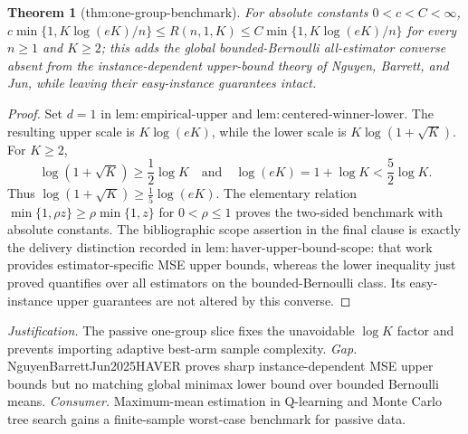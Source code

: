 \documentclass{article}
\newtheorem{theorem}{Theorem}
\begin{document}
\begin{theorem}[thm:one-group-benchmark]\label{thm:one-group-benchmark}
For absolute constants \(0<c<C<\infty\), \(c\min\{1,K\log(eK)/n\}\le R(n,1,K)\le C\min\{1,K\log(eK)/n\}\) for every \(n\ge1\) and \(K\ge2\); this adds the global bounded-Bernoulli all-estimator converse absent from the instance-dependent upper-bound theory of Nguyen, Barrett, and Jun, while leaving their easy-instance guarantees intact.
\end{theorem}
\begin{proof}
Set \(d=1\) in \(\mathrm{lem{:}empirical\text{-}upper}\) and \(\mathrm{lem{:}centered\text{-}winner\text{-}lower}\).  The resulting upper scale is \(K\log(eK)\), while the lower scale is \(K\log(1+\sqrt K)\).  For \(K\geq2\),
\[
 \log(1+\sqrt K)\geq\frac12\log K
 \quad\text{and}\quad
 \log(eK)=1+\log K<\frac52\log K.
\]
Thus \(\log(1+\sqrt K)\geq\frac15\log(eK)\).  The elementary relation \(\min\{1,\rho z\}\geq\rho\min\{1,z\}\) for \(0<\rho\leq1\) proves the two-sided benchmark with absolute constants.  The bibliographic scope assertion in the final clause is exactly the delivery distinction recorded in \(\mathrm{lem{:}haver\text{-}upper\text{-}bound\text{-}scope}\): that work provides estimator-specific MSE upper bounds, whereas the lower inequality just proved quantifies over all estimators on the bounded-Bernoulli class.  Its easy-instance upper guarantees are not altered by this converse.
\end{proof}
\par\smallskip\noindent \textit{Justification.} The passive one-group slice fixes the unavoidable \(\log K\) factor and prevents importing adaptive best-arm sample complexity. \textit{Gap.} NguyenBarrettJun2025HAVER proves sharp instance-dependent MSE upper bounds but no matching global minimax lower bound over bounded Bernoulli means. \textit{Consumer.} Maximum-mean estimation in Q-learning and Monte Carlo tree search gains a finite-sample worst-case benchmark for passive data.
\end{document}
